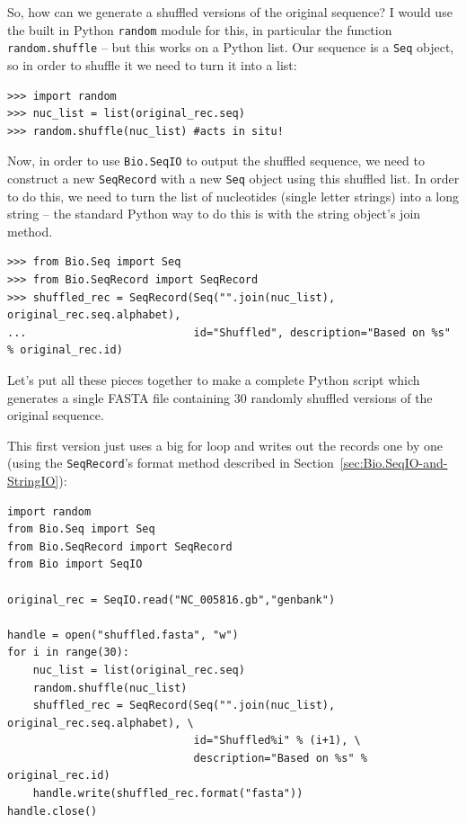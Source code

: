 \documentclass{report}
\begin{document}
So, how can we generate a shuffled versions of the original sequence?  I would
use the built in Python \verb|random| module for this, in particular the function
\verb|random.shuffle| -- but this works on a Python list.  Our sequence is a
\verb|Seq| object, so in order to shuffle it we need to turn it into a list:

\begin{verbatim}
>>> import random
>>> nuc_list = list(original_rec.seq)
>>> random.shuffle(nuc_list) #acts in situ!
\end{verbatim}

Now, in order to use \verb|Bio.SeqIO| to output the shuffled sequence, we need
to construct a new \verb|SeqRecord| with a new \verb|Seq| object using this
shuffled list.  In order to do this, we need to turn the list of nucleotides
(single letter strings) into a long string -- the standard Python way to do
this is with the string object's join method.

\begin{verbatim}
>>> from Bio.Seq import Seq
>>> from Bio.SeqRecord import SeqRecord
>>> shuffled_rec = SeqRecord(Seq("".join(nuc_list), original_rec.seq.alphabet),
...                          id="Shuffled", description="Based on %s" % original_rec.id)
\end{verbatim}

Let's put all these pieces together to make a complete Python script which
generates a single FASTA file containing 30 randomly shuffled versions of
the original sequence.

This first version just uses a big for loop and writes out the records one by one
(using the \verb|SeqRecord|'s format method described in
Section~\ref{sec:Bio.SeqIO-and-StringIO}):

\begin{verbatim}
import random
from Bio.Seq import Seq
from Bio.SeqRecord import SeqRecord
from Bio import SeqIO

original_rec = SeqIO.read("NC_005816.gb","genbank")

handle = open("shuffled.fasta", "w")
for i in range(30):
    nuc_list = list(original_rec.seq)
    random.shuffle(nuc_list)
    shuffled_rec = SeqRecord(Seq("".join(nuc_list), original_rec.seq.alphabet), \
                             id="Shuffled%i" % (i+1), \
                             description="Based on %s" % original_rec.id)
    handle.write(shuffled_rec.format("fasta"))
handle.close()
\end{verbatim}
\end{document}
